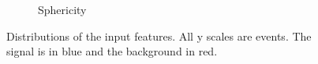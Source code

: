 \begin{figure}[htbp]
\begin{subfigure}[b]{0.25\textwidth}
	                \caption{Sphericity}
	                \label{fig:sphericity}
	\end{subfigure}

	\caption{Distributions of the input features. All y scales are events. The signal is in blue and the background in red.}
	
	\label{fig:label}
\end{figure} 

